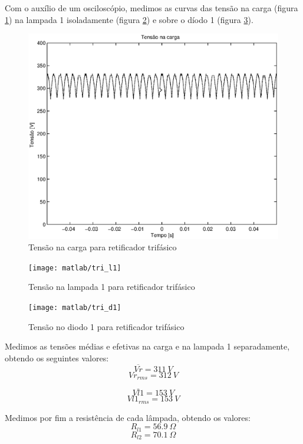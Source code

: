 \documentclass{report}
\begin{document}
{{Com o auxílio de um osciloscópio, medimos as curvas das tensão na carga (figura \ref{fig:tvr}) na lampada 1 isoladamente (figura \ref{fig:tl1}) e sobre o díodo 1 (figura \ref{fig:td1}).
\begin{figure}[H]
	\centering
	\includegraphics[width=0.7\linewidth]{dados/trifasico/tri_r}
	\caption{Tensão na carga para retificador trifásico}
	\label{fig:tvr}
\end{figure}
\begin{figure}[H]
	\centering
	\texttt{[image: matlab/tri\_l1]}
	\caption{Tensão na lampada 1 para retificador trifásico}
	\label{fig:tl1}
\end{figure}
\begin{figure}[H]
	\centering
	\texttt{[image: matlab/tri\_d1]}
	\caption{Tensão no diodo 1 para retificador trifásico}
	\label{fig:td1}
\end{figure}

Medimos as tensões médias e efetivas na carga e na lampada 1 separadamente, obtendo os seguintes valores:
\begin{equation}
\overline{Vr} = 311\ V
\end{equation}
\begin{equation}
Vr_{rms} =  312\ V
\end{equation}

\begin{equation}
\overline{Vl1} = 153\ V
\end{equation}
\begin{equation}
Vl1_{rms} =  153\ V
\end{equation}

Medimos por fim a resistência de cada lâmpada, obtendo os valores:
\begin{equation}
	R_{l1} = 56.9\ \Omega
\end{equation}
\begin{equation}
	R_{l2} = 70.1\ \Omega
\end{equation}

}}
\end{document}
